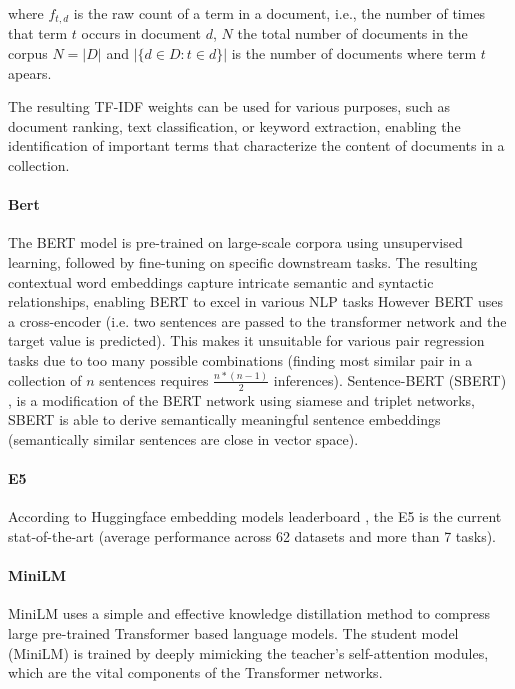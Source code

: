 \documentclass[a4paper,12pt]{article}
\begin{document}
where $f_{t,d}$ is the raw count of a term in a document, i.e., the number of times that term $t$ occurs in document $d$,
$N$ the total number of documents in the corpus $N=|D|$ and  $|\{d \in D: t \in d\}|$ is the number of documents where term $t$ apears.

The resulting TF-IDF weights can be used for various purposes, such as document ranking, text classification, or keyword extraction, enabling the identification of important terms that characterize the content of documents in a collection.

\paragraph{Bert}
The BERT model \cite{bert} is pre-trained on large-scale corpora using unsupervised learning, followed by fine-tuning on specific downstream tasks. The resulting contextual word embeddings capture intricate semantic and syntactic relationships, enabling BERT to excel in various NLP tasks However BERT \cite{bert} uses a cross-encoder (i.e. two sentences are passed to the transformer network and the target value is predicted). This makes it unsuitable for various pair regression tasks due to too many possible combinations (finding most similar pair in a collection of $n$ sentences requires $\frac{n*(n-1)}{2}$ inferences). Sentence-BERT (SBERT) \cite{sbert}, is a modification of the BERT network using siamese and triplet networks, SBERT is able to
derive semantically meaningful sentence embeddings (semantically similar sentences are close in vector space).

\paragraph{E5}
According to Huggingface embedding models leaderboard \cite{embedding-leaderboard}, the E5 \cite{e5} is the current stat-of-the-art (average performance across 62 datasets and more than 7 tasks).

\paragraph{MiniLM}
MiniLM \cite{minilm} uses a simple and effective knowledge distillation method to compress large pre-trained Transformer based language models. The student model (MiniLM) is trained by deeply mimicking the teacher’s self-attention \cite{attention} modules,
which are the vital components of the Transformer networks.
\end{document}
